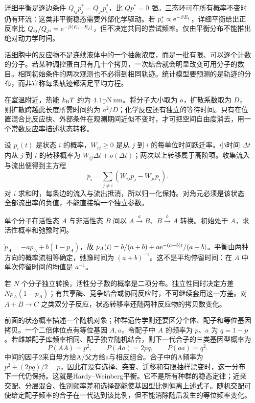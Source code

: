 详细平衡是逐边条件 $Q_{ij}p_j^*=Q_{ji}p_i^*$，比 $Qp^*=0$ 强。三态环可在所有概率不变时仍有环流：这类非平衡稳态需要外部化学驱动。若 $p_i^*\propto\mathrm e^{-\beta E_i}$，详细平衡给出正反率比 $Q_{ij}/Q_{ji}=\mathrm e^{-\beta(E_i-E_j)}$，但不决定共同的尝试频率。仅由平衡分布不能推出绝对动力学时间。

活细胞中的反应物不是连续液体中的一个抽象浓度，而是一批有限、可以逐个计数的分子。若某种调控蛋白只有几十个拷贝，一次结合就会明显改变可用分子的数目。相同初始条件的两次观测也不必得到相同轨迹。统计模型要预测的是轨迹的分布，而非宣称每条轨迹都满足平均方程。

在室温附近，热能 $k_{\mathrm B} T$ 约为 $4.1\,\mathrm{pN\,nm}$。将分子大小取为 $a$，扩散系数取为 $D$，则扩散跨越此长度所需时间约为 $a^2/D$；化学反应还有独立的等待时间。只有在位置混合比反应快、外部条件在观测期间近似不变时，才可把空间自由度消去，用一个常数反应率描述状态转移。

设 $p_i(t)$ 是状态 $i$ 的概率，$W_{ij}\geq0$ 是从 $j$ 到 $i$ 的每单位时间跃迁率。小时间 $\Delta t$ 内从 $j$ 到 $i$ 的转移概率为 $W_{ij}\Delta t+o(\Delta t)$；两次以上转移属于高阶项。收集流入与流出便得到主方程
\begin{equation}\label{eq:master}
\dot p_i=\sum_{j\ne i}(W_{ij}p_j-W_{ji}p_i).
\end{equation}
对 $i$ 求和时，每条边的流入与流出抵消，所以归一化保持。对角元必须是该状态全部流出率的负值，不能直接填一个独立参数。

\begin{example}
单个分子在活性态 $A$ 与非活性态 $B$ 间以 $A\xrightarrow{a}B$、$B\xrightarrow{b}A$ 转换。初始处于 $A$，求活性概率和弛豫时间。
\end{example}
\begin{solution}
$\dot p_A=-ap_A+b(1-p_A)$，故 $p_A(t)=b/(a+b)+a\mathrm e^{-(a+b)t}/(a+b)$。平衡由两种方向的概率流相等确定，弛豫时间为 $(a+b)^{-1}$。这不是平均停留时间：在 $A$ 中单次停留时间的均值是 $a^{-1}$。
\end{solution}

若 $N$ 个分子独立转换，活性分子数的概率是二项分布。独立性同时决定方差 $Np_A(1-p_A)$；有共享酶、竞争结合或协同反应时，不可继续套用这一方差。对 $A+B\to C$ 之类双分子反应，状态转移率还随两种反应物的拷贝数变化。


前面的状态概率描述一个随机对象；种群遗传学则还要区分个体、配子和等位基因拷贝。一个二倍体位点有等位基因 $A,a$，令配子中 $A$ 的频率为 $p$、$a$ 为 $q=1-p$。若雌雄配子库频率相同、配子独立随机结合，则下一代合子的三类基因型概率为
\[
 P(AA)=p^2,\qquad P(Aa)=2pq,\qquad P(aa)=q^2.
\]
中间的因子2来自母方给A/父方给a与相反组合。合子中的A频率为 $p^2+(2pq)/2=p$，因此在没有选择、突变、迁移和有限抽样漂变时，这一分布下一代仍保持。这就是Hardy--Weinberg平衡。它不是所有种群的稳态定律；近亲交配、分层混合、性别频率差和选择都能使基因型比例偏离上述式子。随机交配可使给定配子频率的合子在一代达到该比例，但不能消除随后发生的等位频率变化。


